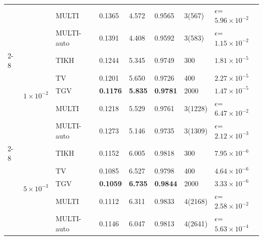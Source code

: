 \begin{tabular}{llllllll}
 &  & MULTI & 0.1365 & 4.572 & 0.9565 & 3(567) & $\epsilon$=$5.96\times 10^{-2}$ \\
 &  & MULTI-auto & 0.1391 & 4.408 & 0.9592 & 3(583) & $\epsilon$=$1.15\times 10^{-2}$ \\
\cmidrule{2-8}
 & \multirow{5}{*}{$1\times 10^{-2}$} & TIKH & 0.1244 & 5.345 & 0.9749 & 300 & $1.81\times 10^{-5}$ \\
 &  & TV & 0.1201 & 5.650 & 0.9726 & 400 & $2.27\times 10^{-5}$ \\
 &  & TGV & \textbf{0.1176} & \textbf{5.835} & \textbf{0.9781} & 2000 & $1.47\times 10^{-5}$ \\
 &  & MULTI & 0.1218 & 5.529 & 0.9761 & 3(1228) & $\epsilon$=$6.47\times 10^{-2}$ \\
 &  & MULTI-auto & 0.1273 & 5.146 & 0.9735 & 3(1309) & $\epsilon$=$2.12\times 10^{-3}$ \\
\cmidrule{2-8}
 & \multirow{5}{*}{$5\times 10^{-3}$} & TIKH & 0.1152 & 6.005 & 0.9818 & 300 & $7.95\times 10^{-6}$ \\
 &  & TV & 0.1085 & 6.527 & 0.9798 & 400 & $4.64\times 10^{-6}$ \\
 &  & TGV & \textbf{0.1059} & \textbf{6.735} & \textbf{0.9844} & 2000 & $3.33\times 10^{-6}$ \\
 &  & MULTI & 0.1112 & 6.311 & 0.9833 & 4(2168) & $\epsilon$=$2.58\times 10^{-2}$ \\
 &  & MULTI-auto & 0.1146 & 6.047 & 0.9813 & 4(2641) & $\epsilon$=$5.63\times 10^{-4}$ \\
\bottomrule
\end{tabular}
